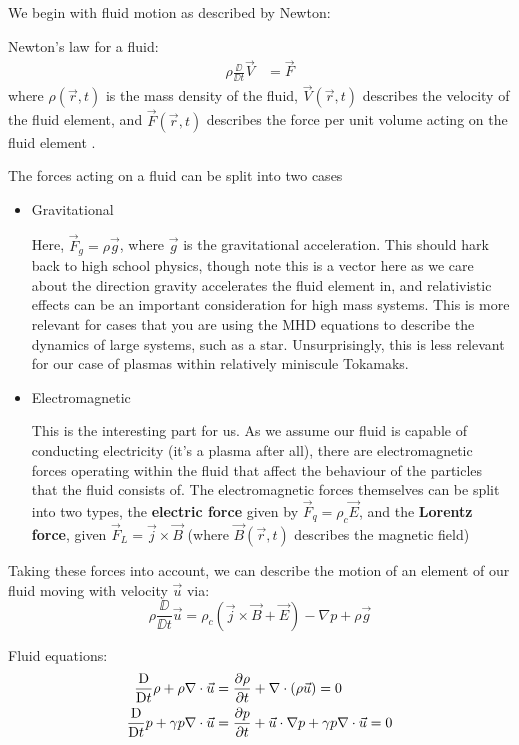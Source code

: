 We begin with fluid motion as described by Newton:
\begin{definition}
    Newton's law for a fluid:
    \begin{align}
        \rho \frac{\DD }{\DD t} \vec{V} &= \vec{F}
    \end{align}
    where $\rho(\vec{r}, t)$ is the mass density of the fluid, 
    $\vec{V}(\vec{r}, t)$ describes the velocity of the fluid element, and $\vec{F}(\vec{r}, t)$ 
    describes the force per unit volume acting on the fluid element \cite{mhd-lectures}.
\end{definition}
The forces acting on a fluid can be split into two cases
\begin{itemize}
    \item Gravitational
    
    Here, $\vec{F}_g = \rho \vec{g}$, where $\vec{g}$ is the gravitational acceleration. This should hark back to high school 
    physics, though note this is a vector here as we care about the direction gravity accelerates the fluid element in, 
    and relativistic effects can be an important consideration for high mass systems. This is more relevant for cases that 
    you are using the MHD equations to describe the dynamics of large systems, such as a star. Unsurprisingly, this is less relevant 
    for our case of plasmas within relatively miniscule Tokamaks.

    \item Electromagnetic
    
    This is the interesting part for us. As we assume our fluid is capable of conducting electricity (it's a plasma after all),
    there are electromagnetic forces operating within the fluid that affect the behaviour of the particles that the fluid consists of. 
    The electromagnetic forces themselves can be split into two types, the \textbf{electric force} given by $\vec{F}_q = \rho_c \vec{E}$, 
    and the \textbf{Lorentz force}, given $\vec{F}_{L} = \vec{j} \times \vec{B}$ (where $\vec{B}(\vec{r}, t)$ describes the magnetic field)
\end{itemize}
Taking these forces into account, we can describe the motion of an element of our fluid moving with velocity $\vec{u}$ 
via:
\begin{equation}
    \rho \frac{\DD}{\DD t} \vec{u} = \rho_c \left ( \vec{j} \times \vec{B} + \vec{E} \right ) - \nabla p + \rho \vec{g}
\end{equation}


\begin{definition}
    Fluid equations:
    \begin{align}
        \frac{\text{D}}{\text{D} t} \rho + \rho \nabla \cdot \vec{u} &= \pdv{\rho}{t} + \nabla \cdot (\rho \vec{u}) = 0 \\
        \frac{\text{D}}{\text{D} t} p + \gamma p \nabla \cdot \vec{u} &= \pdv{p}{t} + \vec{u} \cdot \nabla p + \gamma p \nabla \cdot \vec{u} = 0
    \end{align}
\end{definition}



